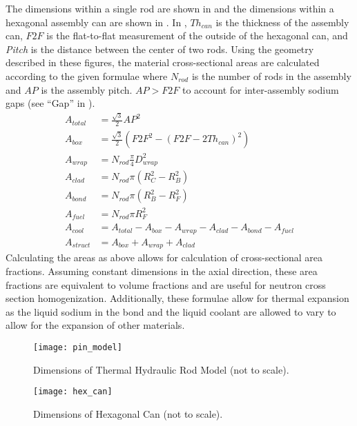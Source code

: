   The dimensions within a single rod are shown in  and the
  dimensions within a hexagonal assembly can are shown in . In
  , $T\!h_{can}$ is the thickness of the assembly can,
  $F\!2\!F$ is the flat-to-flat measurement of the outside of the hexagonal can,
  and \textit{Pitch} is the distance between the center of two rods. Using the
  geometry described in these figures, the material cross-sectional areas are
  calculated according to the given formulae where $N_{rod}$ is the number of
  rods in the assembly and $A\!P$ is the assembly pitch. $A\!P > F\!2\!F$ to
  account for inter-assembly sodium gaps (see ``Gap'' in ).
  \begin{align}
    \label{eq:afrac_first}
    A_{total} &= \frac{\sqrt{3}}{2} A\!P^2 \\
    A_{box} &= 
      \frac{\sqrt{3}}{2} \left(F\!2\!F^2 - \left(F\!2\!F - 2
      Th_{can}\right)^2\right) \\
    A_{wrap} &= N_{rod} \frac{\pi}{4} D_{wrap}^2 \\
    A_{clad} &= N_{rod} \pi (R_C^2 - R_B^2) \\
    A_{bond} &= N_{rod} \pi (R_B^2 - R_F^2) \\
    A_{fuel} &= N_{rod} \pi R_F^2 \\
    A_{cool} &= A_{total} - A_{box} - A_{wrap} - A_{clad} - A_{bond} -
      A_{fuel}\\
    \label{eq:afrac_last}
    A_{struct} &= A_{box} + A_{wrap} + A_{clad}
  \end{align}
  Calculating the areas as above allows for calculation of cross-sectional area
  fractions. Assuming constant dimensions in the axial direction, these area
  fractions are equivalent to volume fractions and are useful for neutron
  cross section homogenization. Additionally, these formulae allow for thermal
  expansion as the liquid sodium in the bond and the liquid coolant are allowed
  to vary to allow for the expansion of other materials.

  \begin{figure}
    \centering
    \texttt{[image: pin\_model]}
    \caption{Dimensions of Thermal Hydraulic Rod Model (not to scale).}
    \label{fig:pin_model}
  \end{figure}

  \begin{figure}
    \centering
    \texttt{[image: hex\_can]}
    \caption{Dimensions of Hexagonal Can (not to scale).}
    \label{fig:hex_can}
  \end{figure}

